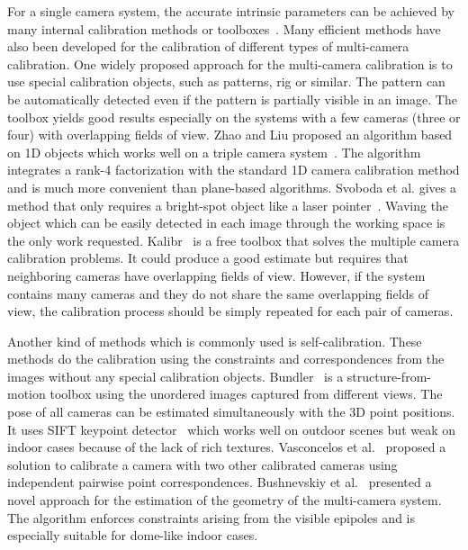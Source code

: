 For a single camera system, the accurate intrinsic parameters can be achieved by many internal calibration methods or toolboxes~\cite{zhang2000flexible,zhang2004camera}. Many efficient methods have also been developed for the calibration of different types of multi-camera calibration.
%
One widely proposed approach for the multi-camera calibration is to use special calibration objects, such as patterns, rig or similar.
%
The pattern can be automatically detected even if the pattern is partially visible in an image. The toolbox yields good results especially on the systems with a few cameras (three or four) with  overlapping fields of view.
%
Zhao and Liu proposed an algorithm based on 1D objects  which works well on a triple camera system~\cite{zhao2008practical}.  The algorithm integrates a rank-4 factorization with the standard 1D camera calibration method and is much more convenient than plane-based algorithms.
Svoboda et al. gives a method that only requires a bright-spot object like a laser pointer~\cite{svoboda2005convenient}. Waving the object which can be easily detected in each image through the working space is the only work requested.
Kalibr~\cite{Maye2013Self} is a free toolbox that solves the multiple camera calibration problems.
%
It could produce a good estimate but requires that neighboring cameras have overlapping fields of view.
However, if the system contains many cameras and they do not share the same overlapping fields of view, the calibration process should be simply repeated for each pair of cameras. 

Another kind of methods which is commonly used is self-calibration. These methods do the calibration using the constraints and correspondences from the images without any special calibration objects.
Bundler~\cite{snavely2006photo} is a structure-from-motion toolbox using the unordered images captured from different views. The pose of all cameras can be estimated simultaneously with the 3D point positions.
It uses SIFT keypoint detector~\cite{lowe2004distinctive} which works well on outdoor scenes but weak on indoor cases because of the lack of rich textures. Vasconcelos et al.~\cite{vasconcelos2012minimal} proposed a solution to calibrate a camera with two other calibrated cameras using independent pairwise point correspondences.
%
Bushnevskiy et al.~\cite{bushnevskiy2016multicamera} presented a novel approach for the estimation of the geometry of the multi-camera system. The algorithm enforces constraints arising from the visible epipoles and is especially suitable for dome-like indoor cases.

